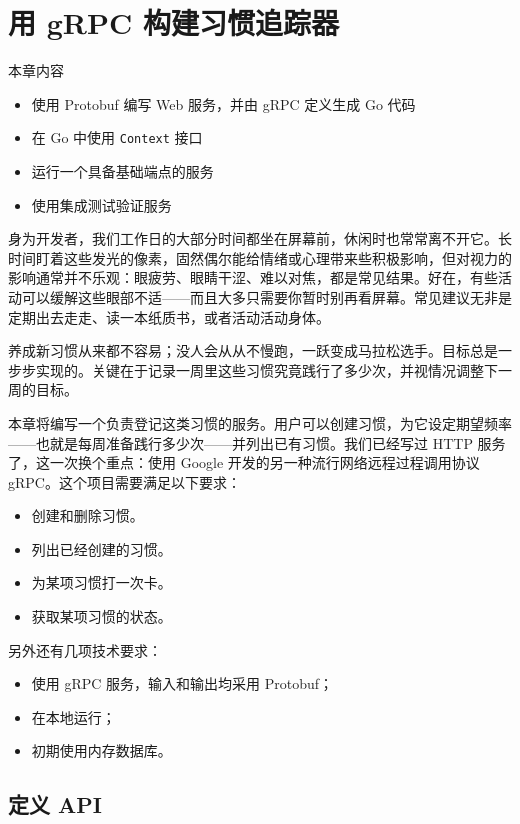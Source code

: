 \chapter{用 gRPC 构建习惯追踪器}

\begin{infobox}{本章内容}
\begin{itemize}
  \item 使用 Protobuf 编写 Web 服务，并由 gRPC 定义生成 Go 代码
  \item 在 Go 中使用 \texttt{Context} 接口
  \item 运行一个具备基础端点的服务
  \item 使用集成测试验证服务
\end{itemize}
\end{infobox}

身为开发者，我们工作日的大部分时间都坐在屏幕前，休闲时也常常离不开它。长时间盯着这些发光的像素，固然偶尔能给情绪或心理带来些积极影响，但对视力的影响通常并不乐观：眼疲劳、眼睛干涩、难以对焦，都是常见结果。好在，有些活动可以缓解这些眼部不适——而且大多只需要你暂时别再看屏幕。常见建议无非是定期出去走走、读一本纸质书，或者活动活动身体。

养成新习惯从来都不容易；没人会从从不慢跑，一跃变成马拉松选手。目标总是一步步实现的。关键在于记录一周里这些习惯究竟践行了多少次，并视情况调整下一周的目标。

本章将编写一个负责登记这类习惯的服务。用户可以创建习惯，为它设定期望频率——也就是每周准备践行多少次——并列出已有习惯。我们已经写过 HTTP 服务了，这一次换个重点：使用 Google 开发的另一种流行网络远程过程调用协议 gRPC。这个项目需要满足以下要求：

\begin{itemize}
  \item 创建和删除习惯。
  \item 列出已经创建的习惯。
  \item 为某项习惯打一次卡。
  \item 获取某项习惯的状态。
\end{itemize}

另外还有几项技术要求：

\begin{itemize}
  \item 使用 gRPC 服务，输入和输出均采用 Protobuf；
  \item 在本地运行；
  \item 初期使用内存数据库。
\end{itemize}

\section{定义 API}

